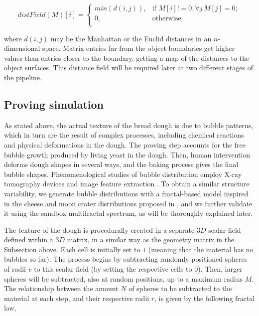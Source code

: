 \documentclass[spanish,a4paper,11pt,oneside,links]{report}
\begin{document}
\[
distField(M)[i] =
\begin{cases}
min(d(i,j)), & \text{if } M[i] != 0, \forall j \, M[j] = 0;\\
0, & \text{otherwise, }\\
\end{cases}
\]


\noindent
where $d(i,j)$ may be the Manhattan or the Euclid distances in an $n$-dimensional space. 
Matrix entries far from the object boundaries get higher values than entries closer to the boundary, getting a map of the distances to the object surfaces. 
This distance field will be required later at two different stages of the pipeline.

\subsection{Proving simulation}
\label{breadprov}

As stated above, the actual texture of the bread dough is due to bubble patterns, which in turn are the result of complex processes, including chemical reactions and physical deformations in the dough.
The proving step accounts for the free bubble growth produced by living yeast in the dough.
Then, human intervention deforms dough shapes in several ways, and the baking process gives the final bubble shapes.
Phenomenological studies of bubble distribution employ X-ray tomography devices and image feature extraction \cite{Babin2006,Gonzales2008,VanDyck2014}.
To obtain a similar structure variability, we generate bubble distributions with a fractal-based model inspired in the cheese and moon crater distributions proposed in \cite{Mandelbrot1982}, and we further validate it using the sandbox multifractal spectrum, as will be thoroughly explained later.

The texture of the dough is procedurally created in a separate $3D$ scalar field defined within a $3D$ matrix, in a similar way as the geometry matrix in the Subsection above.
Each cell is initially set to $1$ (meaning that the material has no bubbles so far).
The process begins by subtracting randomly positioned spheres of radii $v$ to this scalar field (by setting the respective cells to $0$).
Then, larger spheres will be subtracted, also at random positions, up to a maximum radius $M$.
The relationship between the amount $N$ of spheres to be subtracted to the material at each step, and their respective radii $r$, is given by the following fractal law,
\end{document}
